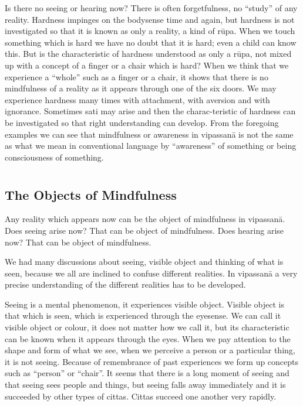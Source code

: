 Is there no seeing or hearing now? There is often forgetfulness, no
``study'' of any reality. Hardness impinges on the bodysense time and
again, but hardness is not investigated so that it is known as only a
reality, a kind of rūpa. When we touch something which is hard we have
no doubt that it is hard; even a child can know this. But is the
characteristic of hardness understood as only a rūpa, not mixed up with
a concept of a finger or a chair which is hard? When we think that we
experience a ``whole'' such as a finger or a chair, it shows that there
is no mindfulness of a reality as it appears through one of the six
doors. We may experience hardness many times with attachment, with
aversion and with ignorance. Sometimes sati may arise and then the
charac-teristic of hardness can be investigated so that right
understanding can develop. From the foregoing examples we can see that
mindfulness or awareness in vipassanā is not the same as what we mean in
conventional language by ``awareness'' of something or being
consciousness of something.


\chapter[The Objects of Mindfulness]{}
\section*{The Objects of Mindfulness}

Any reality which appears now can be the object of mindfulness in
vipassanā. Does seeing arise now? That can be object of mindfulness.
Does hearing arise now? That can be object of mindfulness.

We had many discussions about seeing, visible object and thinking of
what is seen, because we all are inclined to confuse different
realities. In vipassanā a very precise understanding of the different
realities has to be developed.

Seeing is a mental phenomenon, it experiences visible object. Visible
object is that which is seen, which is experienced through the eyesense.
We can call it visible object or colour, it does not matter how we call
it, but its characteristic can be known when it appears through the
eyes. When we pay attention to the shape and form of what we see, when
we perceive a person or a particular thing, it is not seeing. Because of
remembrance of past experiences we form up concepts such as ``person''
or ``chair''. It seems that there is a long moment of seeing and that
seeing sees people and things, but seeing falls away immediately and it
is succeeded by other types of cittas. Cittas succeed one another very
rapidly.

